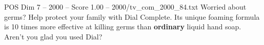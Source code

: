 \begin{textsample}{POS Dim 7 – 2000 – Score 1.00 – 2000/tv\_com\_2000\_84.txt}  \label{ex:f7_pos_053}
Worried about germs?
Help protect your family with Dial Complete.
Its unique foaming formula is 10 times more effective at killing germs than \textbf{ordinary} liquid hand soap.
Aren't you glad you used Dial?

\end{textsample}
